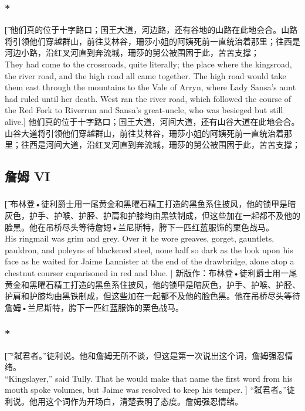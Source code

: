 \documentclass[12pt,a4paper]{article}
\begin{document}
\subsubsection{\color{red}*}\t[
	他们真的位于十字路口；国王大道，河边路，还有谷地的山路在此地会合。山路将引领他们穿越群山，前往艾林谷，珊莎小姐的阿姨死前一直统治着那里；往西是河边小路，沿红叉河直到奔流城，珊莎的舅公被围困于此，苦苦支撑；\\
	They had come to the crossroads, quite literally; the place where the kingsroad, the river road, and the high road all came together. The high road would take them east through the mountains to the Vale of Arryn, where Lady Sansa's aunt had ruled until her death. West ran the river road, which followed the course of the Red Fork to Riverrun and Sansa's great-uncle, who was besieged but still alive.]
	他们真的位于十字路口；国王大道，河间大道，还有山谷大道在此地会合。山谷大道将引领他们穿越群山，前往艾林谷，珊莎小姐的阿姨死前一直统治着那里；往西是河间大道，沿红叉河直到奔流城，珊莎的舅公被围困于此，苦苦支撑；
	
\subsection{詹姆 VI}
\subsubsection{}\t[
	布林登•徒利爵士用一尾黄金和黑曜石精工打造的黑鱼系住披风，他的锁甲是暗灰色，护手、护喉、护胫、护肩和护膝均由黑铁制成，但这些加在一起都不及他的脸黑。他在吊桥尽头等待詹姆•兰尼斯特，胯下一匹红蓝服饰的栗色战马。\\
	His ringmail was grim and grey. Over it he wore greaves, gorget, gauntlets, pauldron, and poleyns of blackened steel, none half so dark as the look upon his face as he waited for Jaime Lannister at the end of the drawbridge, alone atop a chestnut courser caparisoned in red and blue. ]
	新版作：布林登•徒利爵士用一尾黄金和黑曜石精工打造的黑鱼系住披风，他的锁甲是暗灰色，护手、护喉、护胫、护肩和护膝均由黑铁制成，但这些加在一起都不及他的脸色黑。他在吊桥尽头等待詹姆•兰尼斯特，胯下一匹红蓝服饰的栗色战马。
	
\subsubsection{\color{red}*}\t[
	“弑君者。”徒利说。他和詹姆无所不谈，但这是第一次说出这个词，詹姆强忍情绪。\\
	“Kingslayer,” said Tully. That he would make that name the first word from his mouth spoke volumes, but Jaime was resolved to keep his temper. ]
	“弑君者。”徒利说。他用这个词作为开场白，清楚表明了态度。詹姆强忍情绪。
	
\end{document}
